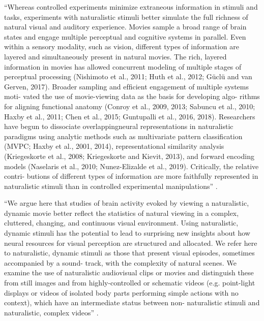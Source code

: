 ``Whereas controlled experiments minimize extraneous information in stimuli and
tasks, experiments with naturalistic stimuli better simulate the full richness
of natural visual and auditory experience. Movies sample a broad range of brain
states and engage multiple perceptual and cognitive systems in parallel. Even
within a sensory modality, such as vision, different types of information are
layered and simultaneously present in natural movies. The rich, layered
information in movies has allowed concurrent modeling of multiple stages of
perceptual processing (Nishimoto et al., 2011; Huth et al., 2012; Güclü and van
Gerven, 2017). Broader sampling and efﬁcient engagement of multiple systems
moti- vated the use of movie-viewing data as the basis for developing algo-
rithms for aligning functional anatomy (Conroy et al., 2009, 2013; Sabuncu et
al., 2010; Haxby et al., 2011; Chen et al., 2015; Guntupalli et al., 2016,
2018). Researchers have begun to dissociate overlappingneural representations in
naturalistic paradigms using analytic methods such as multivariate pattern
classiﬁcation (MVPC; Haxby et al., 2001, 2014), representational similarity
analysis (Kriegeskorte et al., 2008; Kriegeskorte and Kievit, 2013), and forward
encoding models (Naselaris et al., 2010; Nunez-Elizalde et al., 2019).
Critically, the relative contri- butions of different types of information are
more faithfully represented in naturalistic stimuli than in controlled
experimental manipulations'' \citep{haxby2020naturalistic}.

``We argue here that studies of brain activity evoked by viewing a naturalistic,
dynamic movie better reﬂect the statistics of natural viewing in a complex,
cluttered, changing, and continuous visual environment. Using naturalistic,
dynamic stimuli has the potential to lead to surprising new insights about how
neural resources for visual perception are structured and allocated. We refer
here to naturalistic, dynamic stimuli as those that present visual episodes,
sometimes accompanied by a sound- track, with the complexity of natural scenes.
We examine the use of naturalistic audiovisual clips or movies and distinguish
these from still images and from highly-controlled or schematic videos (e.g.
point-light displays or videos of isolated body parts performing simple actions
with no context), which have an intermediate status between non- naturalistic
stimuli and naturalistic, complex videos'' \citep{haxby2020naturalistic}.


